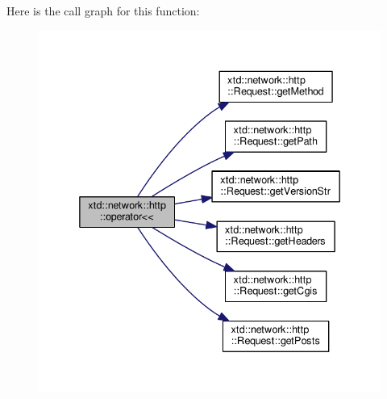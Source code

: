 Here is the call graph for this function\-:
\nopagebreak
\begin{figure}[H]
\begin{center}
\leavevmode
\includegraphics[width=336pt]{namespacextd_1_1network_1_1http_a9cd58530344372f236be8478d9c41ac3_cgraph}
\end{center}
\end{figure}


